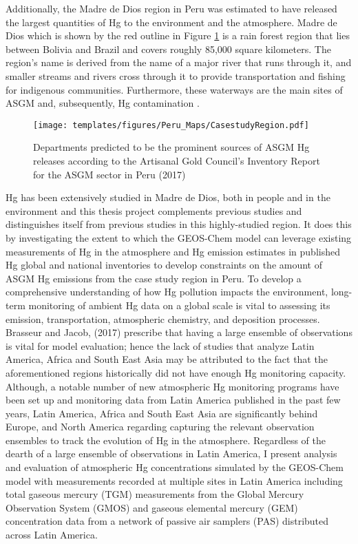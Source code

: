 \begin{flushleft}
Additionally, the Madre de Dios region in Peru was estimated to have released the largest quantities of Hg to the environment and the atmosphere\cite{agc_reporte_2017}. Madre de Dios which is shown by the red outline in Figure \ref{fig:PeruCS} is a rain forest region that lies between Bolivia and Brazil and covers roughly 85,000 square kilometers. The region's name is derived from the name of a major river that runs through it, and smaller streams and rivers cross through it to provide transportation and fishing for indigenous communities. Furthermore, these waterways are the main sites of ASGM and, subsequently, Hg contamination \cite{ashe_elevated_2012,agc_reporte_2017}. 
\begin{figure}[H]
  \texttt{[image: templates/figures/Peru\_Maps/CasestudyRegion.pdf]}
  \centering
  \caption{Departments predicted to be the prominent sources of ASGM Hg releases according to the Artisanal Gold Council's  Inventory Report for the ASGM sector in Peru (2017) }
  \label{fig:PeruCS}
\end{figure}
\FloatBarrier

Hg has been extensively studied in Madre de Dios, both in people and in the environment and this thesis project complements previous studies and distinguishes itself from previous studies in this highly-studied region. It does this by investigating the extent to which the GEOS-Chem model can leverage existing measurements of Hg in the atmosphere and Hg emission estimates in published Hg global and national inventories to develop constraints on the amount of ASGM Hg emissions from the case study region in Peru. To develop a comprehensive understanding of how Hg pollution impacts the environment, long-term monitoring of ambient Hg data on a global scale is vital to assessing its emission, transportation, atmospheric chemistry, and deposition processes. Brasseur and Jacob, (2017) prescribe that having a large ensemble of observations is vital for model evaluation; hence the lack of studies that analyze Latin America, Africa and South East Asia may be attributed to the fact that the aforementioned regions historically did not have enough Hg monitoring capacity. Although, a notable number of new atmospheric Hg monitoring programs have been set up and monitoring data from Latin America published in the past few years, Latin America, Africa and South East Asia are significantly behind Europe, and North America regarding capturing the relevant observation ensembles to track the evolution of Hg in the atmosphere. Regardless of the dearth of a large ensemble  of observations in Latin America, I present analysis and evaluation of atmospheric Hg concentrations simulated by the GEOS-Chem model with measurements recorded at multiple sites in Latin America including total gaseous mercury (TGM) measurements from the Global Mercury Observation System (GMOS) and gaseous elemental mercury (GEM) concentration data from a network of passive air samplers (PAS) distributed across Latin America. 

\end{flushleft}
